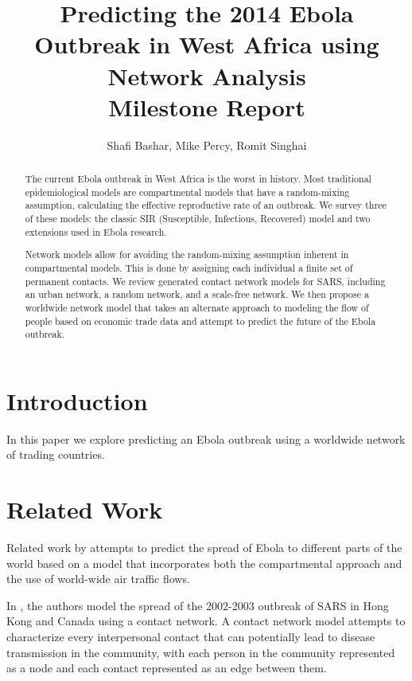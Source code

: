 \documentclass[10pt, journal,onecolumn]{IEEEtran}
\title{Predicting the 2014 Ebola Outbreak in West Africa using Network Analysis \\
       {\large Milestone Report} }
\author{Shafi Bashar, Mike Percy, Romit  Singhai}
\affil{\textit {\{shafiab, mp81, romit\}@stanford.edu}}
\begin{document}
\maketitle

\begin{abstract}
The current Ebola outbreak in West Africa is the worst in history.
Most traditional epidemiological models are compartmental models that have a random-mixing
assumption, calculating the effective reproductive rate of an outbreak.
We survey three of these models: the classic
SIR (Susceptible, Infectious, Recovered) model and two extensions used in Ebola research.

Network models allow for avoiding the random-mixing
assumption inherent in compartmental models.
This is done by assigning each individual a finite set of permanent contacts.
We review generated contact network models for SARS, including an urban network, a random network, and
a scale-free network.
We then propose a worldwide network model that takes an alternate approach to modeling
the flow of people based on economic trade data and attempt to predict the future
of the Ebola outbreak.

\end{abstract}




\section{Introduction}
\label{sec:Introduction}

In this paper we explore predicting an Ebola outbreak using a worldwide network of trading countries.




\section{Related Work}
\label{sec:RelatedWork}

Related work by \citep{gomes2014assessing} attempts to predict the spread of Ebola
to different parts of the world based on a model that incorporates both the compartmental
approach and the use of world-wide air traffic flows.

In \citep{meyers2005network}, the authors model the spread of the 2002-2003
outbreak of SARS in Hong Kong and Canada using a contact network.
A contact network model attempts to characterize every interpersonal contact that can
potentially lead to disease transmission in the community, with each person in the
community represented as a node and each contact represented as an edge between them.
\end{document}
